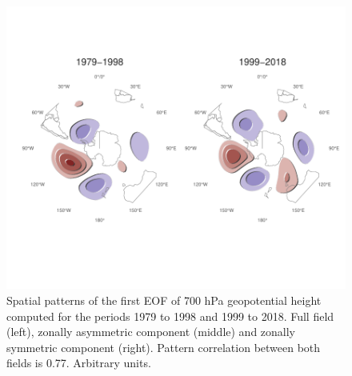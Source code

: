 \documentclass[twocol]{ametsocV5}
\begin{document}
\begin{figure}
\includegraphics{A11-1} \caption[Spatial patterns of the first EOF of 700 hPa geopotential height computed for the periods 1979 to 1998 and 1999 to 2018]{Spatial patterns of the first EOF of 700 hPa geopotential height computed for the periods 1979 to 1998 and 1999 to 2018. Full field (left), zonally asymmetric component (middle) and zonally symmetric component (right). Pattern correlation between both fields is 0.77. Arbitrary units.}\label{fig:A11}
\end{figure}
\end{document}
